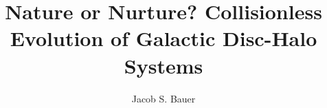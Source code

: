 

%


\newcommand{\zrms}{z_{\rm rms}}
\newcommand{\zeff}{z_{\rm rms,eff}}
\renewcommand{\thepage}{}




\title{Nature or Nurture? Collisionless Evolution of Galactic Disc-Halo Systems}

\author{Jacob S. Bauer}



\beforepreface


